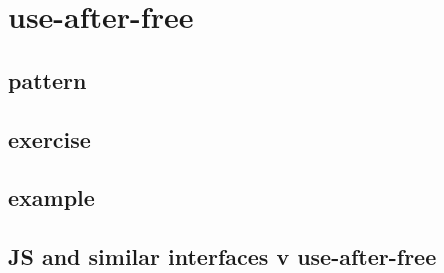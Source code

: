 

\section{use-after-free}


\subsection{pattern}


\subsection{exercise}


\subsection{example}


\subsection{JS and similar interfaces v use-after-free}

